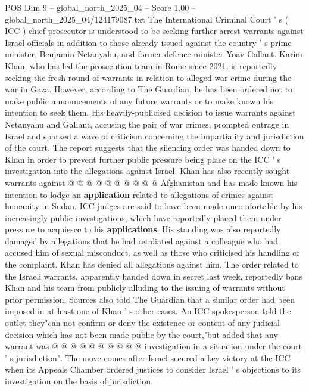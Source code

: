 \begin{textsample}{POS Dim 9 – global\_north\_2025\_04 – Score 1.00 – global\_north\_2025\_04/124179087.txt}  \label{ex:f9_pos_321}
The International Criminal Court ' s ( ICC ) chief prosecutor is understood to be seeking further arrest warrants against Israel officials in addition to those already issued against the country ' s prime minister, Benjamin Netanyahu, and former defence minister Yoav Gallant.
Karim Khan, who has led the prosecution team in Rome since 2021, is reportedly seeking the fresh round of warrants in relation to alleged war crime during the war in Gaza.
However, according to The Guardian, he has been ordered not to make public announcements of any future warrants or to make known his intention to seek them.
His heavily-publicised decision to issue warrants against Netanyahu and Gallant, accusing the pair of war crimes, prompted outrage in Israel and sparked a wave of criticism concerning the impartiality and jurisdiction of the court.
The report suggests that the silencing order was handed down to Khan in order to prevent further public pressure being place on the ICC ' s investigation into the allegations against Israel.
Khan has also recently sought warrants against @ @ @ @ @ @ @ @ @ @ Afghanistan and has made known his intention to lodge an \textbf{application} related to allegations of crimes against humanity in Sudan.
ICC judges are said to have been made uncomfortable by his increasingly public investigations, which have reportedly placed them under pressure to acquiesce to his \textbf{applications}.
His standing was also reportedly damaged by allegations that he had retaliated against a colleague who had accused him of sexual misconduct, as well as those who criticised his handling of the complaint.
Khan has denied all allegations against him.
The order related to the Israeli warrants, apparently handed down in secret last week, reportedly bans Khan and his team from publicly alluding to the issuing of warrants without prior permission.
Sources also told The Guardian that a similar order had been imposed in at least one of Khan ' s other cases.
An ICC spokesperson told the outlet they"can not confirm or deny the existence or content of any judicial decision which has not been made public by the court,"but added that any warrant was @ @ @ @ @ @ @ @ @ @ investigation in a situation under the court ' s jurisdiction".
The move comes after Israel secured a key victory at the ICC when its Appeals Chamber ordered justices to consider Israel ' s objections to its investigation on the basis of jurisdiction.

\end{textsample}
